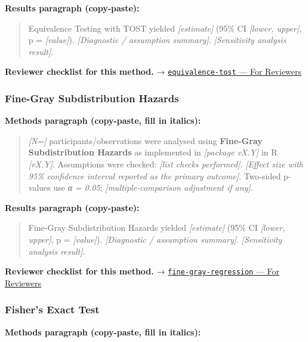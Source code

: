 \documentclass[
]{article}
\begin{document}
\textbf{Results paragraph (copy-paste):}

\begin{quote}
Equivalence Testing with TOST yielded \emph{{[}estimate{]}} (95\% CI
\emph{{[}lower, upper{]}}, p = \emph{{[}value{]}}). \emph{{[}Diagnostic
/ assumption summary{]}}. \emph{{[}Sensitivity analysis result{]}}.
\end{quote}

\textbf{Reviewer checklist for this method.} →
\href{../chapters/04-inferential/equivalence-tost.Rmd\#for-reviewers}{\texttt{equivalence-tost}
--- For Reviewers}

\subsubsection{Fine-Gray Subdistribution
Hazards}\label{fine-gray-subdistribution-hazards}

\textbf{Methods paragraph (copy-paste, fill in italics):}

\begin{quote}
\emph{{[}N={]}} participants/observations were analysed using
\textbf{Fine-Gray Subdistribution Hazards} as implemented in
\emph{{[}package vX.Y{]}} in R \emph{{[}vX.Y{]}}. Assumptions were
checked: \emph{{[}list checks performed{]}}. \emph{{[}Effect size with
95\% confidence interval reported as the primary outcome{]}}. Two-sided
p-values use \emph{α = 0.05}; \emph{{[}multiple-comparison adjustment if
any{]}}.
\end{quote}

\textbf{Results paragraph (copy-paste):}

\begin{quote}
Fine-Gray Subdistribution Hazards yielded \emph{{[}estimate{]}} (95\% CI
\emph{{[}lower, upper{]}}, p = \emph{{[}value{]}}). \emph{{[}Diagnostic
/ assumption summary{]}}. \emph{{[}Sensitivity analysis result{]}}.
\end{quote}

\textbf{Reviewer checklist for this method.} →
\href{../chapters/11-survival/fine-gray-regression.Rmd\#for-reviewers}{\texttt{fine-gray-regression}
--- For Reviewers}

\subsubsection{Fisher's Exact Test}\label{fishers-exact-test}

\textbf{Methods paragraph (copy-paste, fill in italics):}
\end{document}
